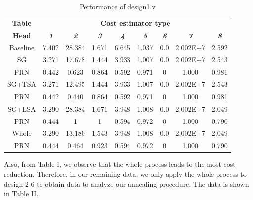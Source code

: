 \documentclass[conference]{IEEEtran}
\begin{document}
\begin{table}[htbp]
\caption{Performance of design1.v}
\begin{center}
\begin{tabular}{|c|c|c|c|c|c|c|c|c|}
\hline
\textbf{Table}&\multicolumn{8}{|c|}{\textbf{Cost estimator type}} \\
\cline{2-9} 
\textbf{Head} & 
\textbf{\textit{1}}& 
\textbf{\textit{2}}&
\textbf{\textit{3}}&
\textbf{\textit{4}}&
\textbf{\textit{5}}&
\textbf{\textit{6}}&
\textbf{\textit{7}}&
\textbf{\textit{8}} \\
\hline
Baseline&7.402&28.384&1.671&6.645&1.037&0.0&2.002E+7&2.592\\
\hline

SG&3.271&17.678&1.444&3.933&1.007 &0.0 &2.002E+7&2.543\\
\cline{2-9}
PRN&0.442&0.623&0.864&0.592&0.971&0&1.000&0.981\\
\hline

SG+TSA&3.271&12.495&1.444&3.933&1.007 &0.0 &2.002E+7&2.543\\
\cline{2-9}
PRN&0.442&0.440&0.864&0.592&0.971&0&1.000&0.981\\
\hline

SG+LSA&3.290 &28.384&1.671&3.948&1.008&0.0&2.002E+7&2.049\\
\cline{2-9}
PRN&0.444&1&1&0.594&0.972&0&1.000&0.790\\
\hline

Whole&3.290 &13.180&1.543&3.948&1.008&0.0&2.002E+7&2.049\\
\cline{2-9}
PRN&0.444&0.464&0.923&0.594&0.972&0&1.000&0.790\\
\hline

\end{tabular}
\label{tab1}
\end{center}
\end{table}

Also, from Table I, we observe that the whole process leads to the most cost reduction. Therefore, in our remaining data, we only apply the whole process to design 2-6 to obtain data to analyze our annealing procedure. The data is shown in Table II.
\end{document}
